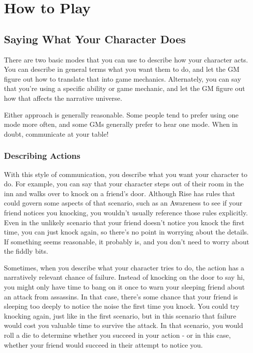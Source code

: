 \chapter{How to Play}

\section{Saying What Your Character Does}
  There are two basic modes that you can use to describe how your character acts.
  You can describe in general terms what you want them to do, and let the GM figure out how to translate that into game mechanics.
  Alternately, you can say that you're using a specific ability or game mechanic, and let the GM figure out how that affects the narrative universe.

  Either approach is generally reasonable.
  Some people tend to prefer using one mode more often, and some GMs generally prefer to hear one mode.
  When in doubt, communicate at your table!

  \subsection{Describing Actions}
    With this style of communication, you describe what you want your character to do.
    For example, you can say that your character steps out of their room in the inn and walks over to knock on a friend's door.
    Although Rise has rules that could govern some aspects of that scenario, such as an Awareness  to see if your friend notices you knocking, you wouldn't usually reference those rules explicitly.
    Even in the unlikely scenario that your friend doesn't notice you knock the first time, you can just knock again, so there's no point in worrying about the details.
    If something seems reasonable, it probably is, and you don't need to worry about the fiddly bits.

    Sometimes, when you describe what your character tries to do, the action has a narratively relevant chance of failure.
    Instead of knocking on the door to say hi, you might only have time to bang on it once to warn your sleeping friend about an attack from assassins.
    In that case, there's some chance that your friend is sleeping too deeply to notice the noise the first time you knock.
    You could try knocking again, just like in the first scenario, but in this scenario that failure would cost you valuable time to survive the attack.
    In that scenario, you would roll a die to determine whether you succeed in your action - or in this case, whether your friend would succeed in their attempt to notice you.

